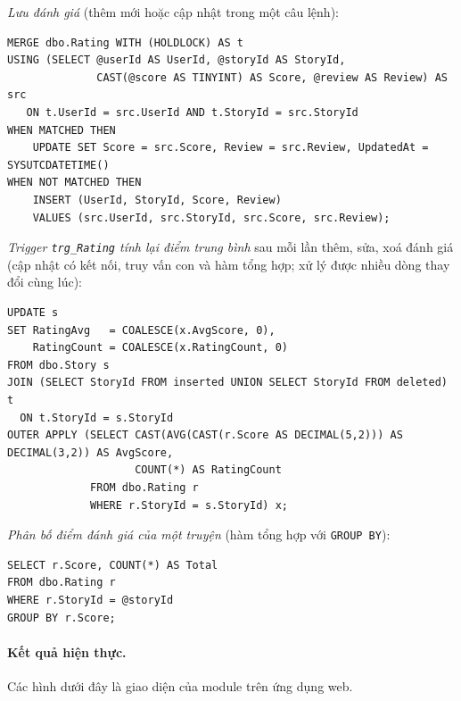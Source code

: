 \textit{Lưu đánh giá} (thêm mới hoặc cập nhật trong một câu lệnh):
\begin{verbatim}
MERGE dbo.Rating WITH (HOLDLOCK) AS t
USING (SELECT @userId AS UserId, @storyId AS StoryId,
              CAST(@score AS TINYINT) AS Score, @review AS Review) AS src
   ON t.UserId = src.UserId AND t.StoryId = src.StoryId
WHEN MATCHED THEN
    UPDATE SET Score = src.Score, Review = src.Review, UpdatedAt = SYSUTCDATETIME()
WHEN NOT MATCHED THEN
    INSERT (UserId, StoryId, Score, Review)
    VALUES (src.UserId, src.StoryId, src.Score, src.Review);
\end{verbatim}

\textit{Trigger \texttt{trg\_Rating} tính lại điểm trung bình} sau mỗi lần thêm, sửa, xoá đánh giá (cập nhật có kết nối, truy vấn con và hàm tổng hợp; xử lý được nhiều dòng thay đổi cùng lúc):
\begin{verbatim}
UPDATE s
SET RatingAvg   = COALESCE(x.AvgScore, 0),
    RatingCount = COALESCE(x.RatingCount, 0)
FROM dbo.Story s
JOIN (SELECT StoryId FROM inserted UNION SELECT StoryId FROM deleted) t
  ON t.StoryId = s.StoryId
OUTER APPLY (SELECT CAST(AVG(CAST(r.Score AS DECIMAL(5,2))) AS DECIMAL(3,2)) AS AvgScore,
                    COUNT(*) AS RatingCount
             FROM dbo.Rating r
             WHERE r.StoryId = s.StoryId) x;
\end{verbatim}

\textit{Phân bố điểm đánh giá của một truyện} (hàm tổng hợp với \texttt{GROUP BY}):
\begin{verbatim}
SELECT r.Score, COUNT(*) AS Total
FROM dbo.Rating r
WHERE r.StoryId = @storyId
GROUP BY r.Score;
\end{verbatim}

\paragraph{Kết quả hiện thực.} Các hình dưới đây là giao diện của module trên ứng dụng web.


